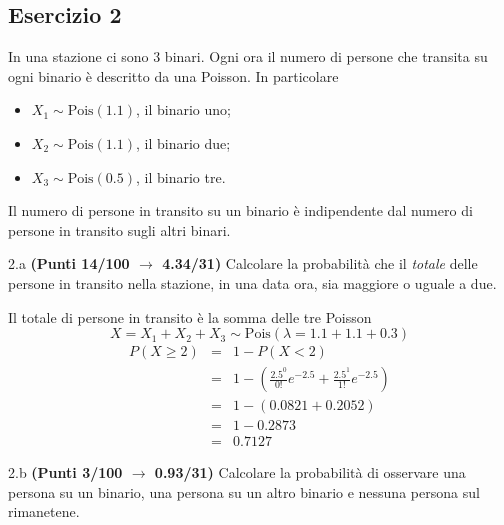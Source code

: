 \documentclass[
  11pt,
]{book}
\providecommand{\tightlist}{%
  \setlength{\itemsep}{0pt}\setlength{\parskip}{0pt}}
\theoremstyle{mytheoremstyle}
\theoremstyle{mydefstyle}
\newenvironment{sol}
  {
  \begin{tcolorbox}[enhanced,breakable,arc=0.1mm,boxrule=1pt,colback=white,colframe=iblue,
  title=\bf \fontfamily{lmss}\selectfont \hspace{.5 cm} Soluzione,drop fuzzy shadow]

}{
\end{tcolorbox}
  }
\begin{document}
\subsection{Esercizio 2}\label{esercizio-2-8}

In una stazione ci sono 3 binari. Ogni ora il numero di persone che transita su ogni
binario è descritto da una Poisson. In particolare

\begin{itemize}
\tightlist
\item
  \(X_1\sim\text{Pois}(1.1)\), il binario uno;
\item
  \(X_2\sim\text{Pois}(1.1)\), il binario due;
\item
  \(X_3\sim\text{Pois}(0.5)\), il binario tre.
\end{itemize}

Il numero di persone in transito su un binario è indipendente dal numero di persone in transito sugli altri binari.

2.a \textbf{(Punti 14/100 \(\rightarrow\) 4.34/31)} Calcolare la probabilità che il \emph{totale} delle persone in transito nella stazione, in una data ora, sia maggiore o uguale a due.

\begin{sol}
Il totale di persone in transito è la somma delle tre Poisson
\[
X=X_1+X_2+X_3\sim \text{Pois}(\lambda=1.1+1.1+0.3)
\]
\begin{eqnarray*}
   P( X \geq 2 ) &=& 1-P( X < 2 ) \\                 &=& 1-\left( \frac{ 2.5 ^{ 0 }}{ 0 !}e^{- 2.5 }+\frac{ 2.5 ^{ 1 }}{ 1 !}e^{- 2.5 } \right)\\                 &=& 1-( 0.0821+0.2052 )\\                 &=& 1- 0.2873 \\                 &=&   0.7127 
\end{eqnarray*}

\end{sol}

2.b \textbf{(Punti 3/100 \(\rightarrow\) 0.93/31)} Calcolare la probabilità di osservare una persona su un binario, una persona su un altro binario e nessuna persona sul rimanetene.
\end{document}
